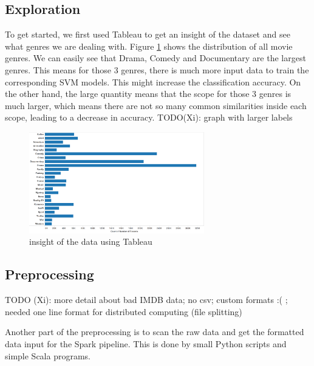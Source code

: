 \documentclass{vldb}
\begin{document}
\subsection{Exploration}
\par To get started, we first used Tableau to get an insight of the dataset and see what genres we are dealing with. Figure \ref{fig:tableau} shows the distribution of all movie genres. We can easily see that Drama, Comedy and Documentary are the largest genres. This means for those 3 genres, there is much more input data to train the corresponding SVM models. This might increase the classification accuracy. On the other hand, the large quantity means that the scope for those 3 genres is much larger, which means there are not so many common similarities inside each scope, leading to a decrease in accuracy.
TODO(Xi): graph with larger labels
\begin{figure}
\begin{center}
\includegraphics[width=3.00in]{genresContribution.png}
\caption{insight of the data using Tableau}
\label{fig:tableau}
\end{center}
\end{figure} 

\subsection{Preprocessing}
\par TODO (Xi): more detail about bad IMDB data; no csv; custom formats :( ; needed one line format for distributed computing (file splitting)
\par Another part of the preprocessing is to scan the raw data and get the formatted data input for the Spark pipeline. This is done by small Python scripts and simple Scala programs.
\end{document}

